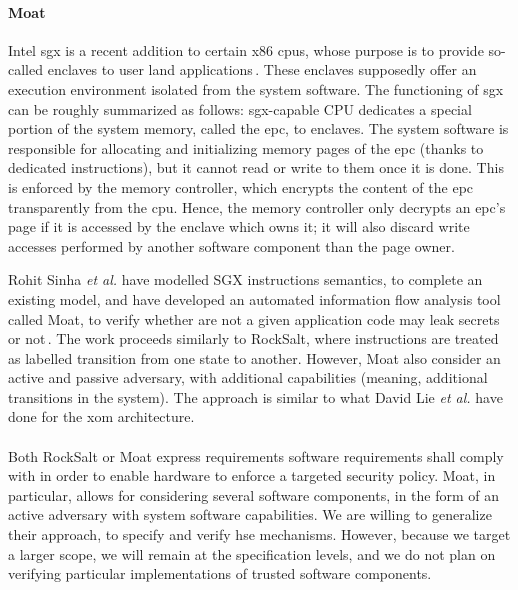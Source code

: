 \paragraph{Moat}
%
Intel \ac{sgx} is a recent addition to certain x86 \acp{cpu}, whose purpose is
to provide so-called enclaves to user land
applications\,\cite{costan2016sgxexplained}.
%
These enclaves supposedly offer an execution environment isolated from the
system software.
%
The functioning of \ac{sgx} can be roughly summarized as follows:
\ac{sgx}-capable CPU dedicates a special portion of the system memory, called
the \ac{epc}, to enclaves.
%
The system software is responsible for allocating and initializing memory pages
of the \ac{epc} (thanks to dedicated instructions), but it cannot read or write
to them once it is done.
%
This is enforced by the memory controller, which encrypts the content of the
\ac{epc} transparently from the \ac{cpu}.
%
Hence, the memory controller only decrypts an \ac{epc}'s page if it is accessed
by the enclave which owns it; it will also discard write accesses performed by
another software component than the page owner.

Rohit Sinha \emph{et al.} have modelled SGX instructions semantics, to complete
an existing model, and have developed an automated information flow analysis
tool called Moat, to verify whether are not a given application code may leak
secrets or not\,\cite{sinha2015moat}.
%
The work proceeds similarly to RockSalt, where instructions are treated as
labelled transition from one state to another.
%
However, Moat also consider an active and passive adversary, with additional
capabilities (meaning, additional transitions in the system).
%
The approach is similar to what David Lie \emph{et al.} have done for the
\ac{xom} architecture.

\paragraph{}
%
Both RockSalt or Moat express requirements software requirements shall comply
with in order to enable hardware to enforce a targeted security policy.
%
Moat, in particular, allows for considering several software components, in the
form of an active adversary with system software capabilities.
%
We are willing to generalize their approach, to specify and verify \ac{hse}
mechanisms.
%
However, because we target a larger scope, we will remain at the specification
levels, and we do not plan on verifying particular implementations of trusted
software components.

